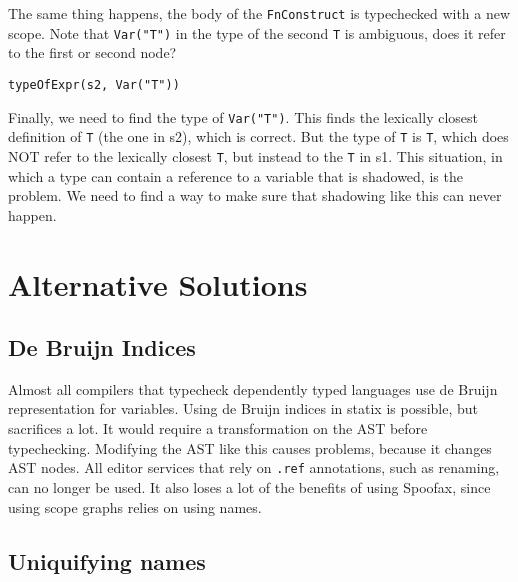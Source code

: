 \noindent
The same thing happens, the body of the \verb|FnConstruct| is typechecked with a new scope. Note that \verb|Var("T")| in the type of the second \verb|T| is ambiguous, does it refer to the first or second node?

\begin{lstlisting}
typeOfExpr(s2, Var("T"))
\end{lstlisting}

Finally, we need to find the type of \verb|Var("T")|. This finds the lexically closest definition of \verb|T| (the one in s2), which is correct. But the type of \verb|T| is \verb|T|, which does NOT refer to the lexically closest \verb|T|, but instead to the \verb|T| in s1. This situation, in which a type can contain a reference to a variable that is shadowed, is the problem. We need to find a way to make sure that shadowing like this can never happen.

\section{Alternative Solutions}

\subsection{De Bruijn Indices}

Almost all compilers that typecheck dependently typed languages use de Bruijn representation for variables. Using de Bruijn indices in statix is possible, but sacrifices a lot. It would require a transformation on the AST before typechecking. Modifying the AST like this causes problems, because it changes AST nodes. All editor services that rely on \verb|.ref| annotations, such as renaming, can no longer be used. It also loses a lot of the benefits of using Spoofax, since using scope graphs relies on using names.

\subsection{Uniquifying names}

